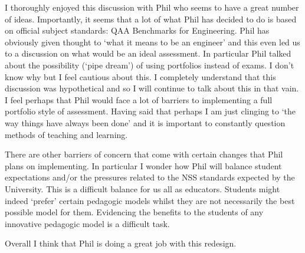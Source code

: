\documentclass{article}
\begin{document}
I thoroughly enjoyed this discussion with Phil who seems to have a great number of ideas. Importantly, it seems that a lot of what Phil has decided to do is based on official subject standards: QAA Benchmarks for Engineering. Phil has obviously given thought to `what it means to be an engineer' and this even led us to a discussion on what would be an ideal assessment. In particular Phil talked about the possibility (`pipe dream') of using portfolios instead of exams. I don't know why but I feel cautious about this. I completely understand that this discussion was hypothetical and so I will continue to talk about this in that vain. I feel perhaps that Phil would face a lot of barriers to implementing a full portfolio style of assessment. Having said that perhaps I am just clinging to `the way things have always been done' and it is important to constantly question methods of teaching and learning.

There are other barriers of concern that come with certain changes that Phil plans on implementing. In particular I wonder how Phil will balance student expectations and/or the pressures related to the NSS standards expected by the University. This is a difficult balance for us all as educators. Students might indeed `prefer' certain pedagogic models whilst they are not necessarily the best possible model for them. Evidencing the benefits to the students of any innovative pedagogic model is a difficult task.

Overall I think that Phil is doing a great job with this redesign.
\end{document}
